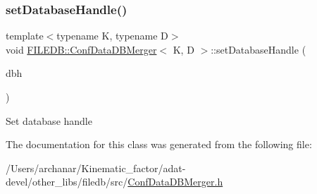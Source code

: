\subsubsection{\texorpdfstring{setDatabaseHandle()}{setDatabaseHandle()}\hspace{0.1cm}{\footnotesize\ttfamily [3/3]}}
{\footnotesize\ttfamily template$<$typename K, typename D$>$ \\
void \mbox{\hyperlink{classFILEDB_1_1ConfDataDBMerger}{F\+I\+L\+E\+D\+B\+::\+Conf\+Data\+D\+B\+Merger}}$<$ K, D $>$\+::set\+Database\+Handle (\begin{DoxyParamCaption}\item[{\mbox{\hyperlink{classFILEDB_1_1AllConfStoreDB}{All\+Conf\+Store\+DB}}$<$ K, D $>$ $\ast$}]{dbh }\end{DoxyParamCaption})\hspace{0.3cm}{\ttfamily [inline]}}

Set database handle 

The documentation for this class was generated from the following file\+:\begin{DoxyCompactItemize}
\item 
/\+Users/archanar/\+Kinematic\+\_\+factor/adat-\/devel/other\+\_\+libs/filedb/src/\mbox{\hyperlink{adat-devel_2other__libs_2filedb_2src_2ConfDataDBMerger_8h}{Conf\+Data\+D\+B\+Merger.\+h}}\end{DoxyCompactItemize}
